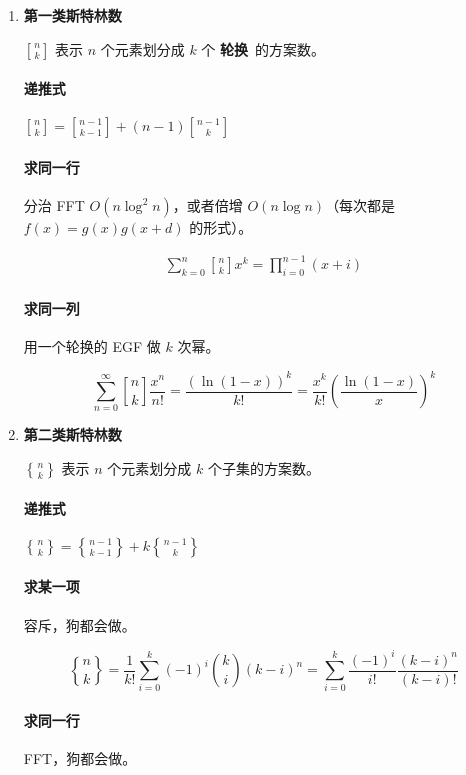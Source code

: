 \begin{enumerate}

\item \textbf{第一类斯特林数}

$n\brack k$ 表示 $n$ 个元素划分成 $k$ 个 \textbf{轮换}\ 的方案数。

\paragraph{递推式} ${n \brack k} = {n-1 \brack k-1} + (n-1){n-1 \brack k}$

\paragraph{求同一行} 分治 FFT $O(n\log ^2 n)$，或者倍增 $O(n\log n)$（每次都是 $f(x) = g(x) g(x + d)$ 的形式）。

$$ \begin{aligned} \sum_{k = 0} ^ n {n \brack k} x^k = \prod_{i = 0} ^ {n - 1} (x + i) \end{aligned} $$

\paragraph{求同一列} 用一个轮换的 EGF 做 $k$ 次幂。

$$ \sum_{n = 0} ^ \infty {n \brack k} \frac {x ^ n} {n!} = \frac {\left(\ln (1 - x)\right) ^ k} {k!} = \frac {x ^ k} {k!} \left( \frac {\ln (1 - x)} x \right) ^ k $$

\item \textbf{第二类斯特林数}

$n\brace k$ 表示 $n$ 个元素划分成 $k$ 个子集的方案数。

\paragraph{递推式} ${n \brace k} = {n-1 \brace k-1} + k{n-1 \brace k}$

\paragraph{求某一项} 容斥，狗都会做。

$$ {n \brace k} = \frac 1 {k!} \sum_{i = 0} ^ k (-1) ^ i {k \choose i} (k - i) ^ n = \sum_{i = 0} ^ k \frac {(-1) ^ i} {i!} \frac {(k - i) ^ n} {(k - i)!} $$

\paragraph{求同一行} FFT，狗都会做。


\end{enumerate}

